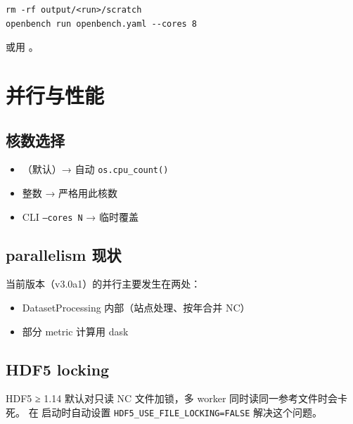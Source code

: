 \begin{verbatim}
rm -rf output/<run>/scratch
openbench run openbench.yaml --cores 8
\end{verbatim}

或用 。

\section{并行与性能}

\subsection{核数选择}

\begin{itemize}
  \item {}（默认）→ 自动 \texttt{os.cpu\_count()}
  \item 整数 → 严格用此核数
  \item CLI \texttt{--cores N} → 临时覆盖
\end{itemize}

\subsection{parallelism 现状}

当前版本（v3.0a1）的并行主要发生在两处：

\begin{itemize}
  \item DatasetProcessing 内部（站点处理、按年合并 NC）
  \item 部分 metric 计算用 dask
\end{itemize}


\subsection{HDF5 locking}

HDF5 ≥ 1.14 默认对只读 NC 文件加锁，多 worker 同时读同一参考文件时会卡死。\openbench{} 在  启动时自动设置 \texttt{HDF5\_USE\_FILE\_LOCKING=FALSE} 解决这个问题。


